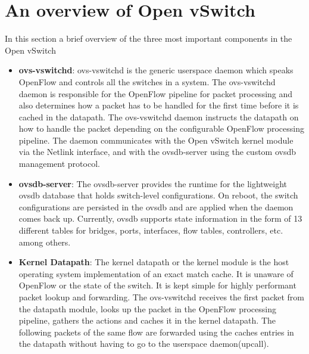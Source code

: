 \section{An overview of Open vSwitch}
In this section a brief overview of the three most important components in the Open vSwitch \cite{pfaff2015design}
\begin{itemize}
 \item \textbf{ovs-vswitchd}: ovs-vswitchd is the generic userspace daemon which speaks OpenFlow and controls all the switches in a system. The ovs-vswitchd daemon is responsible for the OpenFlow pipeline for packet processing and also determines how a packet has to be handled for the first time before it is cached in the datapath. The ovs-vswitchd daemon instructs the datapath on how to handle the packet depending on the configurable OpenFlow processing pipeline. The daemon communicates with the Open vSwitch kernel module via the Netlink interface, and with the ovsdb-server using the custom ovsdb management protocol.
 \item \textbf{ovsdb-server}: The ovsdb-server provides the runtime for the lightweight ovsdb database that holds switch-level configurations. On reboot, the switch configurations are persisted in the ovsdb and are applied when the daemon comes back up. Currently, ovsdb supports state information in the form of 13 different tables for bridges, ports, interfaces, flow tables, controllers, etc. among others.
 \item \textbf{Kernel Datapath}: The kernel datapath or the kernel module is the host operating system implementation of an exact match cache. It is unaware of OpenFlow or the state of the switch. It is kept simple for highly performant packet lookup and forwarding. The ovs-vswitchd receives the first packet from the datapath module, looks up the packet in the OpenFlow processing pipeline, gathers the actions and caches it in the kernel datapath. The following packets of the same flow are forwarded using the caches entries in the datapath without having to go to the userspace daemon(upcall).
\end{itemize}

